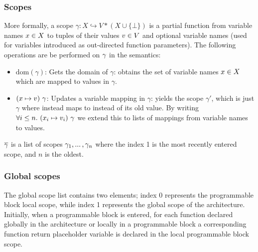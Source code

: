 \documentclass[UTF8]{article}
\begin{document}
\subsubsection*{Scopes}
More formally, a scope $\gamma : X \hookrightarrow V * (X \cup \{ \bot \} )$ is a partial function from variable names $x{} \in X$ to tuples of their values $v{} \in V$ and optional variable names (used for variables introduced as out-directed function parameters). The following operations are be performed on $\gamma$ in the semantics:
\begin{itemize}
\item $\mathrm{dom} ( \gamma )$: Gets the domain of $\gamma$: obtains the set of variable names $x{} \in X$ which are mapped to values in $\gamma$.
\item $(x \mapsto  v) \,\, \gamma$: Updates a variable mapping in $\gamma$: yields the scope $\gamma'$, which is just $\gamma$ where \vn{} instead maps to \cval{} instead of its old value. By writing $\forall i \leq n. \,\, ({x}_i \mapsto  {\ensuremath{v}}_i) \,\, \gamma$ we extend this to lists of mappings from variable names to values.
\end{itemize}
$\overline{\gamma}$ is a list of scopes $\gamma_1 , ... \, , \gamma_n$ where the index 1 is the most recently entered scope, and $n$ is the oldest.

\subsubsection*{Global scopes}
The global scope list \gscopel{} contains two elements; index 0 represents the programmable block local scope, while index 1 represents the global scope of the architecture. Initially, when a programmable block is entered, for each function declared globally in the architecture or locally in a programmable block a corresponding function return placeholder variable is declared in the local programmable block scope.


%
%

\end{document}
